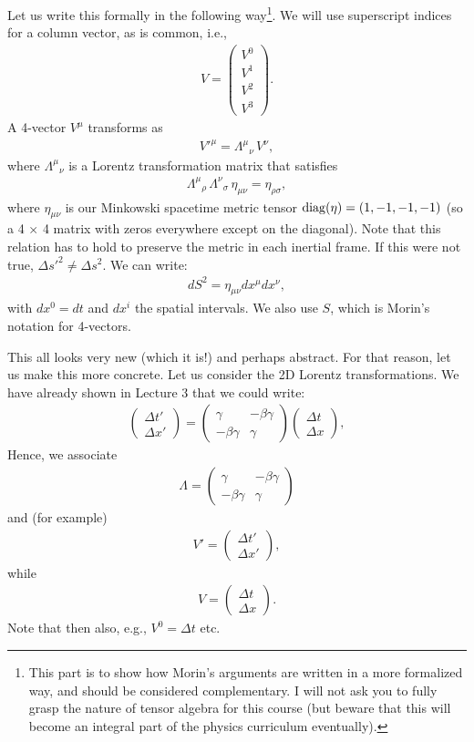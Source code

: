 \documentclass[12pt]{article}
\newcommand{\be}{\begin{eqnarray}}
\newcommand{\ee}{\end{eqnarray}}
\begin{document}
Let us write this formally in the following way\footnote{This part is to show how Morin's arguments are written in a more formalized way, and should be considered complementary. I will not ask you to fully grasp the nature of tensor algebra for this course (but beware that this will become an integral part of the physics curriculum eventually).}. We will use superscript indices for a column vector, as is common, i.e., 
\be
V = \begin{pmatrix}
V^0 \\
V^1 \\
V^2 \\
V^3
\end{pmatrix}.
\ee
A 4-vector $ V^\mu $ transforms as
\be
V'^{\mu} = \Lambda^{\mu}{}_{\nu} \, V^{\nu} \label{eq:LTs},
\ee
where $ \Lambda^{\mu}{}_{\nu} $ is a Lorentz transformation matrix that satisfies
\be
\Lambda^{\mu}{}_{\rho} \, \Lambda^{\nu}{}_{\sigma} \, \eta_{\mu\nu} = \eta_{\rho\sigma} \label{eq:metrucinv},
\ee
where $\eta_{\mu \nu}$ is our Minkowski spacetime metric tensor ${\rm diag}(\eta) = (1,-1,-1,-1)$ (so a 4 $\times$ 4 matrix with zeros everywhere except on the diagonal). Note that this relation has to hold to preserve the metric in each inertial frame. If this were not true, $\Delta s'^2 \neq \Delta s^2$. We can write:
\be
dS^2 = \eta_{\mu \nu} dx^{\mu}dx^{\nu},
\ee
with $dx^0 = dt$ and $dx^i$ the spatial intervals. We also use $S$, which is Morin's notation for 4-vectors. 

This all looks very new (which it is!) and perhaps abstract. For that reason, let us make this more concrete. Let us consider the 2D Lorentz transformations. We have already shown in Lecture 3 that we could write:
\be
\begin{pmatrix}
\Delta t' \\
\Delta x'
\end{pmatrix} =
\begin{pmatrix}
\gamma & -\beta \gamma \\
-\beta \gamma  & \gamma
\end{pmatrix}\begin{pmatrix}
\Delta t \\
\Delta x
\end{pmatrix},
\ee
Hence, we associate 
\be
\Lambda = \begin{pmatrix}
\gamma & -\beta \gamma \\
-\beta \gamma  & \gamma
\end{pmatrix} \label{eq:Gamma}
\ee
and (for example)
\be
V' = \begin{pmatrix}
\Delta t' \\
\Delta x'
\end{pmatrix},
\ee
while 
\be
V = \begin{pmatrix}
\Delta t \\
\Delta x
\end{pmatrix}.
\ee
Note that then also, e.g., $V^0 = \Delta t$ etc. 
\end{document}
